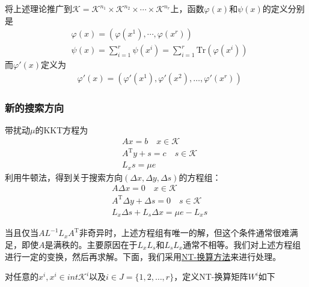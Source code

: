         将上述理论推广到$\mathcal{K}=\mathcal{K}^{n_1}\times \mathcal{K}^{n_2}\times \cdots \times \mathcal{K}^{n_r}$上，函数$\varphi(x)$和$\psi(x)$的定义分别是
        \begin{align*}
         & \varphi(x)=(\varphi(x^{1}),\cdots,\varphi(x^{r}))\\
         & \psi(x)=\mathop{\sum}\limits_{i=1}^r\psi(x^{i})=\mathop{\sum}\limits_{i=1}^r\mathrm{Tr}(\varphi(x^{i}))
        \end{align*}
        而${\varphi}'(x)$定义为
        \begin{align*}
         & {\varphi}'(x)=({\varphi}'(x^1),{\varphi}'(x^2),\ldots,{\varphi}'(x^r))
        \end{align*}
       \subsubsection{新的搜索方向}
            \par
            带扰动$\mu$的KKT方程为
            \begin{align*}
             & Ax=b\quad x \in \mathcal{K}\\
             & A^\mathrm{T} y+s=c\quad s \in \mathcal{K}\\
             & L_xs=\mu e
            \end{align*}
            利用牛顿法，得到关于搜索方向$(\Delta x,\Delta y,\Delta s)$的方程组：
            \begin{align*}
             & A\Delta x=0\quad x \in \mathcal{K}\\
             & A^\mathrm{T} \Delta y+\Delta s=0\quad s \in \mathcal{K}\\
             & L_x\Delta s+L_s\Delta x=\mu e-L_xs
            \end{align*}
            \par
            当且仅当$AL^{-1}L_xA^\mathrm{T} $非奇异时，上述方程组有唯一的解，但这个条件通常很难满足，即使$A$是满秩的。主要原因在于$L_xL_s$和$L_sL_x$通常不相等。我们对上述方程组进行一定的变换，然后再求解。下面，我们采用\underline{NT-换算方法}来进行处理。
            \par
            对任意的$x^i,x^i\in int{}\mathcal{K}^i$以及$i \in J=\{1,2,\ldots,r\}$，定义NT-换算矩阵$W^i$如下
